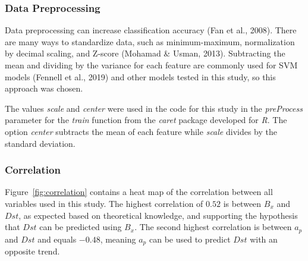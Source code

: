 \documentclass[sn-mathphys-num]{sn-jnl}%
\begin{document}
\subsubsection{Data Preprocessing}

Data preprocessing can increase classification accuracy (Fan et al., 2008). There are many ways to standardize data, such as minimum-maximum, normalization by decimal scaling, and Z-score (Mohamad & Usman, 2013). Subtracting the mean and dividing by the variance for each feature are commonly used for SVM models (Fennell et al., 2019) and other models tested in this study, so this approach was chosen. 

The values \textit{scale} and \textit{center} were used in the code for this study in the \textit{preProcess} parameter for the \textit{train} function from the \textit{caret} package developed for \textit{R}. The option \textit{center} subtracts the mean of each feature while \textit{scale} divides by the standard deviation.

\subsubsection{Correlation}

Figure~\ref{fig:correlation} contains a heat map of the correlation between all variables used in this study. The highest correlation of $0.52$ is between $B_{x}$ and $Dst$, as expected based on theoretical knowledge, and supporting the hypothesis that $Dst$ can be predicted using $B_{x}$. The second highest correlation is between $a_{p}$ and $Dst$ and equals $-0.48$, meaning $a_{p}$ can be used to predict  $Dst$ with an opposite trend.
\end{document}
